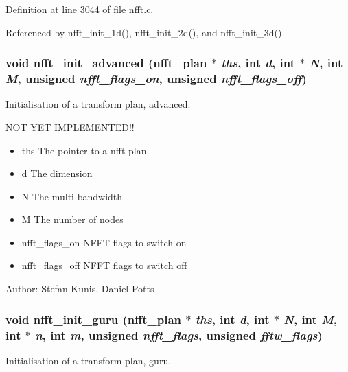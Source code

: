 Definition at line 3044 of file nfft.c.

Referenced by nfft\_\-init\_\-1d(), nfft\_\-init\_\-2d(), and nfft\_\-init\_\-3d().\hypertarget{group__nfft_gcd4a22fd1f6ea476a57759a90510d114}{
\subsubsection{\setlength{\rightskip}{0pt plus 5cm}void nfft\_\-init\_\-advanced ({\bf nfft\_\-plan} $\ast$ {\em ths}, int {\em d}, int $\ast$ {\em N}, int {\em M}, unsigned {\em nfft\_\-flags\_\-on}, unsigned {\em nfft\_\-flags\_\-off})}}
\label{group__nfft_gcd4a22fd1f6ea476a57759a90510d114}


Initialisation of a transform plan, advanced. 

NOT YET IMPLEMENTED!!

\begin{itemize}
\item ths The pointer to a nfft plan \item d The dimension \item N The multi bandwidth \item M The number of nodes \item nfft\_\-flags\_\-on NFFT flags to switch on \item nfft\_\-flags\_\-off NFFT flags to switch off\end{itemize}
\begin{Desc}
\item[Author:]Stefan Kunis, Daniel Potts \end{Desc}
\hypertarget{group__nfft_g406f05717c6299b918261c61aaa9de23}{
\subsubsection{\setlength{\rightskip}{0pt plus 5cm}void nfft\_\-init\_\-guru ({\bf nfft\_\-plan} $\ast$ {\em ths}, int {\em d}, int $\ast$ {\em N}, int {\em M}, int $\ast$ {\em n}, int {\em m}, unsigned {\em nfft\_\-flags}, unsigned {\em fftw\_\-flags})}}
\label{group__nfft_g406f05717c6299b918261c61aaa9de23}


Initialisation of a transform plan, guru. 

